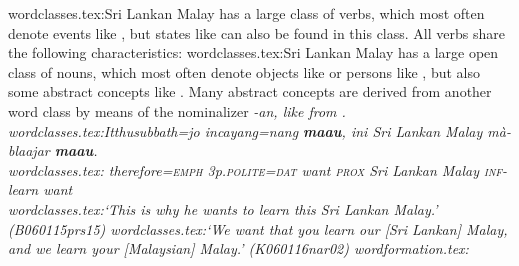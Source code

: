 wordclasses.tex:Sri Lankan Malay has a large class of verbs, which most often denote events like , but  states like  can also be found in this class. All verbs share the following characteristics:
wordclasses.tex:Sri Lankan Malay has a large open class of nouns, which most often denote objects like  or persons like , but also some abstract concepts like . Many abstract concepts are derived from another word class by means of the nominalizer \em -an\em, like  from .
wordclasses.tex:\gll Itthusubbath=jo incayang=nang \textbf{maau}, ini {\em Sri} {\em Lankan} {\em Malay} mà-blaajar \textbf{maau}. \\
wordclasses.tex:  therefore=\textsc{emph} 3p.\textsc{polite}=\textsc{dat} want \textsc{prox} Sri Lankan Malay \textsc{inf}-learn want  \\
wordclasses.tex:`This is why he wants to learn this Sri Lankan Malay.' (B060115prs15)
wordclasses.tex:`We want that you learn our [Sri Lankan] Malay, and we learn your [Malaysian] Malay.' (K060116nar02)
wordformation.tex:%
